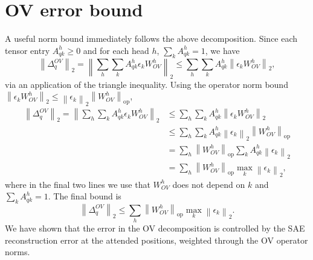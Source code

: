 \documentclass[10pt]{article}
\theoremstyle{definition}
\newcommand{\1}{\mathbf{1}}
\newcommand{\tnorm}[1]{\left\lVert #1 \right\rVert_2}
\newcommand{\opnorm}[1]{\left\lVert #1 \right\rVert_{\mathrm{op}}}
\begin{document}
\section{OV error bound}
A useful norm bound immediately follows the above decomposition. Since each tensor entry $A_{qk}^h \geq 0$ and for each head $h$,  $\sum_k A_{qk}^h = 1$, we have
\[
\tnorm{\Delta_q^{OV}} = \tnorm{\sum_h \sum_k A_{qk}^h \epsilon_k W_{OV}^h} \leq \sum_h \sum_k A_{qk}^h \tnorm{\epsilon_k W_{OV}^h},
\]
via an application of the triangle inequality. Using the operator norm bound $\tnorm{\epsilon_k W_{OV}^h} \leq \tnorm{\epsilon_k}\opnorm{W_{OV}^h}$,
\begin{align}
\tnorm{\Delta_q^{OV}} = \tnorm{\sum_h \sum_k A_{qk}^h \epsilon_k W_{OV}^h} &\leq \sum_h \sum_k A_{qk}^h \tnorm{\epsilon_k W_{OV}^h} \\
&\leq \sum_h \sum_k A_{qk}^h \tnorm{\epsilon_k}\opnorm{W_{OV}^h} \\
&= \sum_h \opnorm{W_{OV}^h} \sum_k A_{qk}^h \tnorm{\epsilon_k} \\
&= \sum_h \opnorm{W_{OV}^h} \max_k \tnorm{\epsilon_k},
\end{align}
where in the final two lines we use that $W_{OV}^h$ does not depend on $k$ and $\sum_k A_{qk}^h = 1$. The final bound is
\begin{equation}
  \boxed{\tnorm{\Delta_q^{OV}} \leq  \sum_h \opnorm{W_{OV}^h} \max_k \tnorm{\epsilon_k}.}
\end{equation}
We have shown that the error in the OV decomposition is controlled by the SAE reconstruction error at the attended positions, weighted through the OV operator norms.
\end{document}
